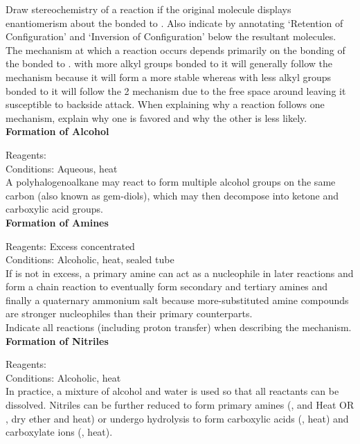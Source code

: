 \documentclass[../main]{subfiles}
\begin{document}
	Draw stereochemistry of a reaction if the original molecule displays enantiomerism about the  bonded to . Also indicate by annotating `Retention of Configuration' and `Inversion of Configuration' below the resultant molecules. \\

	The mechanism at which a  reaction occurs depends primarily on the bonding of the  bonded to .  with more alkyl groups bonded to it will generally follow the  mechanism because it will form a more stable  whereas  with less alkyl groups bonded to it will follow the 2 mechanism due to the free space around  leaving it susceptible to backside attack. When explaining why a reaction follows one mechanism, explain why one is favored and why the other is less likely. \\

	\noindent \textbf{Formation of Alcohol}

	Reagents:  \\
	Conditions: Aqueous, heat \\

	A polyhalogenoalkane may react to form multiple alcohol groups on the same carbon (also known as gem-diols), which may then decompose into ketone and carboxylic acid groups. \\

	\noindent \textbf{Formation of Amines}

	Reagents: Excess concentrated  \\
	Conditions: Alcoholic, heat, sealed tube \\

	If  is not in excess, a primary amine can act as a nucleophile in later reactions and form a chain reaction to eventually form secondary and tertiary amines and finally a quaternary ammonium salt because more-substituted amine compounds are stronger nucleophiles than their primary counterparts. \\

	Indicate all reactions (including proton transfer) when describing the mechanism. \\

	\noindent \textbf{Formation of Nitriles}

	Reagents:  \\
	Conditions: Alcoholic, heat \\

	In practice, a mixture of alcohol and water is used so that all reactants can be dissolved. Nitriles can be further reduced to form primary amines (,  and Heat OR , dry ether and heat) or undergo hydrolysis to form carboxylic acids (, heat) and carboxylate ions (, heat). \\
\end{document}
